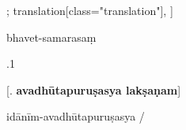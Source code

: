 \begin{alignment}[
  texts=edition[class="edition"];
  translation[class="translation"],
  ]
\begin{edition}
\begin{tlg}
{{  
  }
bhavet-samarasaṃ
\dd{} \begin{otherlanguage}{english}.1\end{otherlanguage}\hskip-2pt\dd{}}
\end{tlg}
\nolinenumbers
\bigskip
\centerline{\textrm{\small{[. \textbf{avadhūtapuruṣasya lakṣaṇam}]}}}%
\label{avadhuta}
\bigskip
\linenumbers
\begin{prose}
  \noindent
idānīm-avadhūtapuruṣasya
/ 
       \end{prose}
       \begin{tlg}
            \noindent

\end{tlg}
\end{edition}
\end{alignment}
